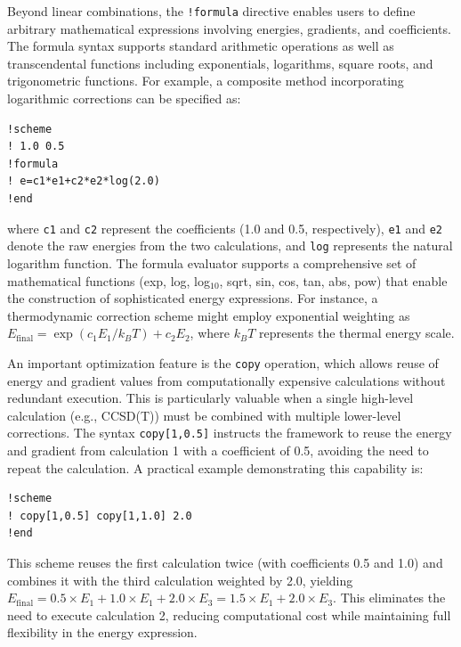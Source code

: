 Beyond linear combinations, the \texttt{!formula} directive enables users to define arbitrary mathematical expressions involving energies, gradients, and coefficients. The formula syntax supports standard arithmetic operations as well as transcendental functions including exponentials, logarithms, square roots, and trigonometric functions. For example, a composite method incorporating logarithmic corrections can be specified as:
\begin{verbatim}
!scheme
! 1.0 0.5
!formula
! e=c1*e1+c2*e2*log(2.0)
!end
\end{verbatim}
where \texttt{c1} and \texttt{c2} represent the coefficients (1.0 and 0.5, respectively), \texttt{e1} and \texttt{e2} denote the raw energies from the two calculations, and \texttt{log} represents the natural logarithm function. The formula evaluator supports a comprehensive set of mathematical functions (exp, log, log$_{10}$, sqrt, sin, cos, tan, abs, pow) that enable the construction of sophisticated energy expressions. For instance, a thermodynamic correction scheme might employ exponential weighting as $E_{\text{final}} = \exp(c_1 E_1 / k_B T) + c_2 E_2$, where $k_B T$ represents the thermal energy scale.

An important optimization feature is the \texttt{copy} operation, which allows reuse of energy and gradient values from computationally expensive calculations without redundant execution. This is particularly valuable when a single high-level calculation (e.g., CCSD(T)) must be combined with multiple lower-level corrections. The syntax \texttt{copy[1,0.5]} instructs the framework to reuse the energy and gradient from calculation 1 with a coefficient of 0.5, avoiding the need to repeat the calculation. A practical example demonstrating this capability is:
\begin{verbatim}
!scheme
! copy[1,0.5] copy[1,1.0] 2.0
!end
\end{verbatim}
This scheme reuses the first calculation twice (with coefficients 0.5 and 1.0) and combines it with the third calculation weighted by 2.0, yielding $E_{\text{final}} = 0.5 \times E_1 + 1.0 \times E_1 + 2.0 \times E_3 = 1.5 \times E_1 + 2.0 \times E_3$. This eliminates the need to execute calculation 2, reducing computational cost while maintaining full flexibility in the energy expression.

